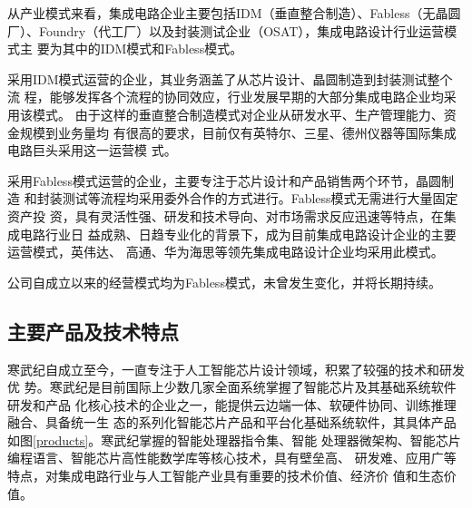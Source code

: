 从产业模式来看，集成电路企业主要包括IDM（垂直整合制造）、Fabless（无晶圆
厂）、Foundry（代工厂）以及封装测试企业（OSAT），集成电路设计行业运营模式主
要为其中的IDM模式和Fabless模式。\par
采用IDM模式运营的企业，其业务涵盖了从芯片设计、晶圆制造到封装测试整个流
程，能够发挥各个流程的协同效应，行业发展早期的大部分集成电路企业均采用该模式。
由于这样的垂直整合制造模式对企业从研发水平、生产管理能力、资金规模到业务量均
有很高的要求，目前仅有英特尔、三星、德州仪器等国际集成电路巨头采用这一运营模
式。\par
采用Fabless模式运营的企业，主要专注于芯片设计和产品销售两个环节，晶圆制造
和封装测试等流程均采用委外合作的方式进行。Fabless模式无需进行大量固定资产投
资，具有灵活性强、研发和技术导向、对市场需求反应迅速等特点，在集成电路行业日
益成熟、日趋专业化的背景下，成为目前集成电路设计企业的主要运营模式，英伟达、
高通、华为海思等领先集成电路设计企业均采用此模式。\par
公司自成立以来的经营模式均为Fabless模式，未曾发生变化，并将长期持续。

\subsection{主要产品及技术特点}
寒武纪自成立至今，一直专注于人工智能芯片设计领域，积累了较强的技术和研发优
势。寒武纪是目前国际上少数几家全面系统掌握了智能芯片及其基础系统软件研发和产品
化核心技术的企业之一，能提供云边端一体、软硬件协同、训练推理融合、具备统一生
态的系列化智能芯片产品和平台化基础系统软件，其具体产品如图\ref{products}。寒武纪掌握的智能处理器指令集、智能
处理器微架构、智能芯片编程语言、智能芯片高性能数学库等核心技术，具有壁垒高、
研发难、应用广等特点，对集成电路行业与人工智能产业具有重要的技术价值、经济价
值和生态价值。

